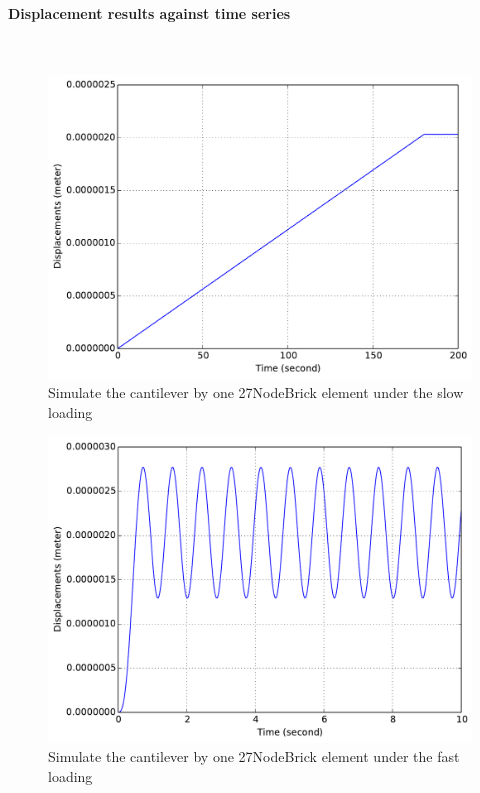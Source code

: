 \paragraph{Displacement results against time series} ~

\begin{figure}[!htb]
  \centering
  \includegraphics[width=12cm]{./Figure-files/_Chapter_Appendix_Illustrative_Examples/brick-1element-slowLoading.pdf}
  \caption{Simulate the cantilever by one 27NodeBrick element under the slow loading}
  \label{fig_brick1-slow}
\end{figure}


\begin{figure}[!htb]
  \centering
  \includegraphics[width=12cm]{./Figure-files/_Chapter_Appendix_Illustrative_Examples/brick-1element-fastLoading.pdf}
  \caption{Simulate the cantilever by one 27NodeBrick element under the fast loading}
  \label{fig_brick1-fast}
\end{figure}

